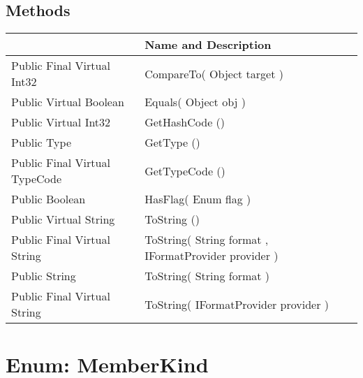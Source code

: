 \documentclass[11pt, oneside, a4paper]{book}
\begin{document}
\subsection{Methods}
\begin{center}
\begin{tabular}{| p{3cm} | p{12cm} | }
\hline
\textbf{ } & \textbf{ Name and Description}\\
\hline
 Public  Final  Virtual  Int32 &  CompareTo(\hypertarget{SoftwareEngineeringTools.{}Documentation.{}Language.{}CompareTo\_Object}{} Object  target  )\\
\hline
 Public  Virtual  Boolean &  Equals(\hypertarget{SoftwareEngineeringTools.{}Documentation.{}Language.{}Equals\_Object}{} Object  obj  )\\
\hline
 Public  Virtual  Int32 &  GetHashCode ()\hypertarget{SoftwareEngineeringTools.{}Documentation.{}Language.{}GetHashCode}{}\\
\hline
 Public  Type &  GetType ()\hypertarget{SoftwareEngineeringTools.{}Documentation.{}Language.{}GetType}{}\\
\hline
 Public  Final  Virtual  TypeCode &  GetTypeCode ()\hypertarget{SoftwareEngineeringTools.{}Documentation.{}Language.{}GetTypeCode}{}\\
\hline
 Public  Boolean &  HasFlag(\hypertarget{SoftwareEngineeringTools.{}Documentation.{}Language.{}HasFlag\_Enum}{} Enum  flag  )\\
\hline
 Public  Virtual  String &  ToString ()\hypertarget{SoftwareEngineeringTools.{}Documentation.{}Language.{}ToString}{}\\
\hline
 Public  Final  Virtual  String &  ToString(\hypertarget{SoftwareEngineeringTools.{}Documentation.{}Language.{}ToString\_String\_IFormatProvider}{} String  format  ,  IFormatProvider  provider  )\\
\hline
 Public  String &  ToString(\hypertarget{SoftwareEngineeringTools.{}Documentation.{}Language.{}ToString\_String}{} String  format  )\\
\hline
 Public  Final  Virtual  String &  ToString(\hypertarget{SoftwareEngineeringTools.{}Documentation.{}Language.{}ToString\_IFormatProvider}{} IFormatProvider  provider  )\\
\hline
\end{tabular}
\end{center}
 


\hypertarget{SoftwareEngineeringTools.{}Documentation.{}MemberKind}{}
\section{Enum: MemberKind}
\end{document}

